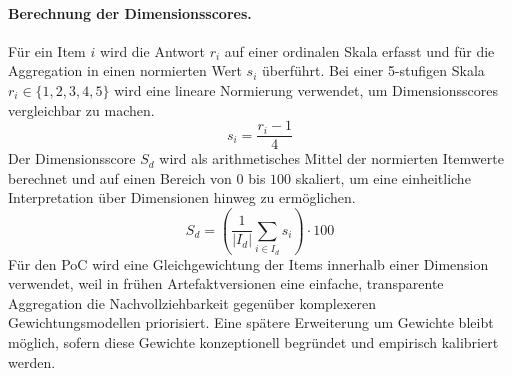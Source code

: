 \paragraph{Berechnung der Dimensionsscores.}
Für ein Item $i$ wird die Antwort $r_i$ auf einer ordinalen Skala erfasst und für die Aggregation in einen normierten Wert $s_i$ überführt.\cite{BeckerKnackstedtPoeppelbuss2009ProcedureModel,deBruin2005MainPhases}
Bei einer 5-stufigen Skala $r_i \in \{1,2,3,4,5\}$ wird eine lineare Normierung verwendet, um Dimensionsscores vergleichbar zu machen.\cite{BeckerKnackstedtPoeppelbuss2009ProcedureModel}
\begin{equation}
s_i = \frac{r_i - 1}{4}
\end{equation}
Der Dimensionsscore $S_d$ wird als arithmetisches Mittel der normierten Itemwerte berechnet und auf einen Bereich von $0$ bis $100$ skaliert, um eine einheitliche Interpretation über Dimensionen hinweg zu ermöglichen.\cite{deBruin2005MainPhases,BeckerKnackstedtPoeppelbuss2009ProcedureModel}
\begin{equation}
S_d = \left(\frac{1}{|I_d|}\sum_{i \in I_d} s_i \right)\cdot 100
\end{equation}
Für den PoC wird eine Gleichgewichtung der Items innerhalb einer Dimension verwendet, weil in frühen Artefaktversionen eine einfache, transparente Aggregation die Nachvollziehbarkeit gegenüber komplexeren Gewichtungsmodellen priorisiert.\cite{PoeppeelbussRoeglinger2011DesignPrinciples,BeckerKnackstedtPoeppelbuss2009ProcedureModel}
Eine spätere Erweiterung um Gewichte bleibt möglich, sofern diese Gewichte konzeptionell begründet und empirisch kalibriert werden.\cite{deBruin2005MainPhases,PoeppeelbussRoeglinger2011DesignPrinciples}

